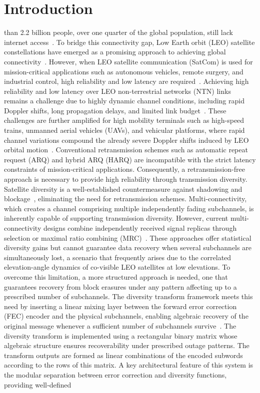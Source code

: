 \documentclass[lettersize,journal]{IEEEtran}
\begin{document}
\section{Introduction}
\label{sec:introduction}
 than 2.2 billion people, over one quarter of the global population, still lack internet access~\cite{ITU2025Facts}. To bridge this connectivity gap, Low Earth orbit (LEO) satellite constellations have emerged as a promising approach to achieving global connectivity~\cite{Kodheli2021,3GPP38821,Lin2021,Luo24}. However, when LEO satellite communication (SatCom) is used for mission-critical applications such as autonomous vehicles, remote surgery, and industrial control, high reliability and low latency are required~\cite{Azari2022, Nguyen2024, Durisi2016}. Achieving high reliability and low latency over LEO non-terrestrial networks (NTN) links remains a challenge due to highly dynamic channel conditions, including rapid Doppler shifts, long propagation delays, and limited link budget~\cite{11240599}. These challenges are further amplified for high mobility terminals such as high-speed trains, unmanned aerial vehicles (UAVs), and vehicular platforms, where rapid channel variations compound the already severe Doppler shifts induced by LEO orbital motion~\cite{Li2021}. Conventional retransmission schemes such as automatic repeat request (ARQ) and hybrid ARQ (HARQ) are incompatible with the strict latency constraints of mission‑critical applications. Consequently, a retransmission-free approach is necessary to provide high reliability through transmission diversity. Satellite diversity is a well-established countermeasure against shadowing and blockage~\cite{Buzzi2023,596901,11299592,Wang2003}, eliminating the need for retransmission schemes. Multi-connectivity, which creates a channel comprising multiple independently fading subchannels, is inherently capable of supporting transmission diversity. However, current multi-connectivity designs combine independently received signal replicas through selection or maximal ratio combining (MRC)~\cite{li2024multiple}. These approaches offer statistical diversity gains but cannot guarantee data recovery when several subchannels are simultaneously lost, a scenario that frequently arises due to the correlated elevation-angle dynamics of co-visible LEO satellites at low elevations. To overcome this limitation, a more structured approach is needed, one that guarantees recovery from block erasures under any pattern affecting up to a prescribed number of subchannels. The diversity transform framework meets this need by inserting a linear mixing layer between the forward error correction (FEC) encoder and the physical subchannels, enabling algebraic recovery of the original message whenever a sufficient number of subchannels survive~\cite{Arikan2025_patent,545895}. The diversity transform is implemented using a rectangular binary matrix whose algebraic structure ensures recoverability under prescribed outage patterns. The transform outputs are formed as linear combinations of the encoded subwords according to the rows of this matrix. A key architectural feature of this system is the modular separation between error correction and diversity functions, providing well‑defined 
\end{document}
